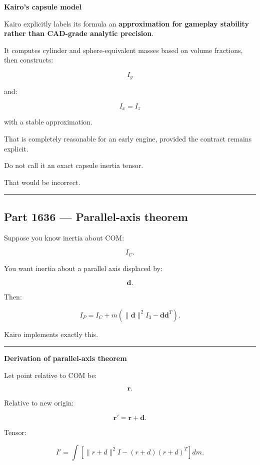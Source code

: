 \textbf{Kairo's capsule model}

Kairo explicitly labels its formula an \textbf{approximation for gameplay stability rather than CAD-grade analytic precision}.

It computes cylinder and sphere-equivalent masses based on volume fractions, then constructs:

\[
I_y
\]

and:

\[
I_x=I_z
\]

with a stable approximation.

That is completely reasonable for an early engine, provided the contract remains explicit.

Do not call it an exact capsule inertia tensor.

That would be incorrect.

\begin{center}\rule{0.5\linewidth}{0.5pt}\end{center}

\subsection{Part 1636 --- Parallel-axis theorem}\label{06-engine-ii-ch035-part-1636-parallel-axis-theorem}

\hypertarget{06-engine-ii-ch035-part-1636-parallel-axis-theorem}{}

Suppose you know inertia about COM:

\[
I_C.
\]

You want inertia about a parallel axis displaced by:

\[
\mathbf{d}.
\]

Then:

\[
\boxed{
I_P
=
I_C
+
m
\left(
\|\mathbf{d}\|^2I_3
-
\mathbf{d}\mathbf{d}^T
\right).
}
\]

Kairo implements exactly this.

\begin{center}\rule{0.5\linewidth}{0.5pt}\end{center}

\textbf{Derivation of parallel-axis theorem}

Let point relative to COM be:

\[
\mathbf{r}.
\]

Relative to new origin:

\[
\mathbf{r}'
=
\mathbf{r}+\mathbf{d}.
\]

Tensor:

\[
I'
=
\int
[
\|r+d\|^2I
-
(r+d)(r+d)^T
]
dm.
\]

